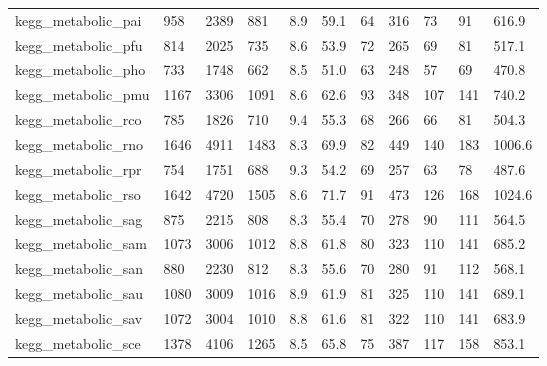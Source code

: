 \begin{longtable}{lllllllllll}
 kegg\_metabolic\_pai                                 & 958        & 2389      & 881   & 8.9    & 59.1   & 64    & 316    & 73     & 91     & 616.9   \\
 kegg\_metabolic\_pfu                                 & 814        & 2025      & 735   & 8.6    & 53.9   & 72    & 265    & 69     & 81     & 517.1   \\
 kegg\_metabolic\_pho                                 & 733        & 1748      & 662   & 8.5    & 51.0   & 63    & 248    & 57     & 69     & 470.8   \\
 kegg\_metabolic\_pmu                                 & 1167       & 3306      & 1091  & 8.6    & 62.6   & 93    & 348    & 107    & 141    & 740.2   \\
 kegg\_metabolic\_rco                                 & 785        & 1826      & 710   & 9.4    & 55.3   & 68    & 266    & 66     & 81     & 504.3   \\
 kegg\_metabolic\_rno                                 & 1646       & 4911      & 1483  & 8.3    & 69.9   & 82    & 449    & 140    & 183    & 1006.6  \\
 kegg\_metabolic\_rpr                                 & 754        & 1751      & 688   & 9.3    & 54.2   & 69    & 257    & 63     & 78     & 487.6   \\
 kegg\_metabolic\_rso                                 & 1642       & 4720      & 1505  & 8.6    & 71.7   & 91    & 473    & 126    & 168    & 1024.6  \\
 kegg\_metabolic\_sag                                 & 875        & 2215      & 808   & 8.3    & 55.4   & 70    & 278    & 90     & 111    & 564.5   \\
 kegg\_metabolic\_sam                                 & 1073       & 3006      & 1012  & 8.8    & 61.8   & 80    & 323    & 110    & 141    & 685.2   \\
 kegg\_metabolic\_san                                 & 880        & 2230      & 812   & 8.3    & 55.6   & 70    & 280    & 91     & 112    & 568.1   \\
 kegg\_metabolic\_sau                                 & 1080       & 3009      & 1016  & 8.9    & 61.9   & 81    & 325    & 110    & 141    & 689.1   \\
 kegg\_metabolic\_sav                                 & 1072       & 3004      & 1010  & 8.8    & 61.6   & 81    & 322    & 110    & 141    & 683.9   \\
 kegg\_metabolic\_sce                                 & 1378       & 4106      & 1265  & 8.5    & 65.8   & 75    & 387    & 117    & 158    & 853.1   \\

\end{longtable}
